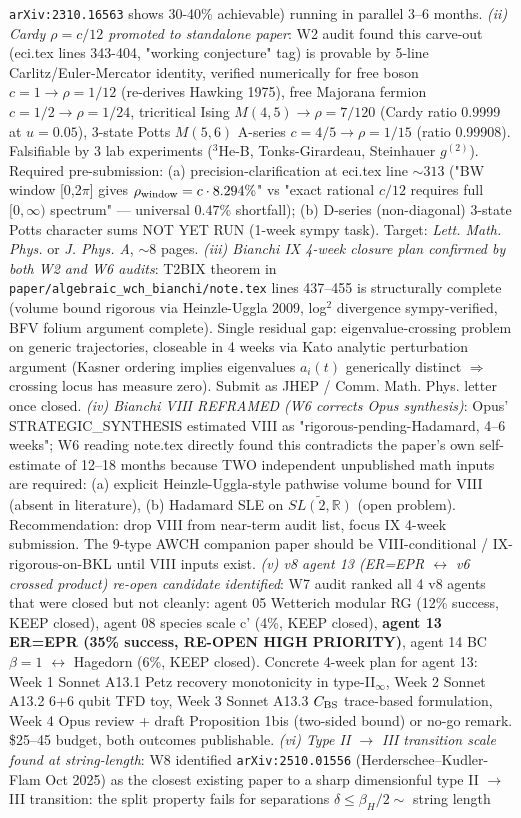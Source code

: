 \documentclass[reprint,amsmath,amssymb,aps,prd,superscriptaddress]{revtex4-2}
\providecommand{\1}{\mathbf{1}}
\begin{document}
\texttt{arXiv:2310.16563} shows 30-40\% achievable) running in parallel 3--6 months. \emph{(ii) Cardy $\rho = c/12$ promoted to standalone paper}: W2 audit found this carve-out (eci.tex lines 343-404, "working conjecture" tag) is provable by 5-line Carlitz/Euler-Mercator identity, verified numerically for free boson $c=1\to\rho=1/12$ (re-derives Hawking 1975), free Majorana fermion $c=1/2\to\rho=1/24$, tricritical Ising $M(4,5)\to\rho=7/120$ (Cardy ratio 0.9999 at $u=0.05$), 3-state Potts $M(5,6)$ A-series $c=4/5\to\rho=1/15$ (ratio 0.99908). Falsifiable by 3 lab experiments ($^3$He-B, Tonks-Girardeau, Steinhauer $g^{(2)}$). Required pre-submission: (a) precision-clarification at eci.tex line $\sim 313$ ("BW window [0,2$\pi$] gives $\rho_{\rm window} = c \cdot 8.294\%$" vs "exact rational $c/12$ requires full $[0,\infty)$ spectrum" — universal $0.47\%$ shortfall); (b) D-series (non-diagonal) 3-state Potts character sums NOT YET RUN (1-week sympy task). Target: \emph{Lett. Math. Phys.} or \emph{J. Phys. A}, $\sim 8$ pages. \emph{(iii) Bianchi IX 4-week closure plan confirmed by both W2 and W6 audits}: T2BIX theorem in \texttt{paper/algebraic\_wch\_bianchi/note.tex} lines 437--455 is structurally complete (volume bound rigorous via Heinzle-Uggla 2009, log$^2$ divergence sympy-verified, BFV folium argument complete). Single residual gap: eigenvalue-crossing problem on generic trajectories, closeable in 4 weeks via Kato analytic perturbation argument (Kasner ordering implies eigenvalues $a_i(t)$ generically distinct $\Rightarrow$ crossing locus has measure zero). Submit as JHEP / Comm. Math. Phys. letter once closed. \emph{(iv) Bianchi VIII REFRAMED (W6 corrects Opus synthesis)}: Opus' STRATEGIC\_SYNTHESIS estimated VIII as "rigorous-pending-Hadamard, 4--6 weeks"; W6 reading note.tex directly found this contradicts the paper's own self-estimate of 12--18 months because TWO independent unpublished math inputs are required: (a) explicit Heinzle-Uggla-style pathwise volume bound for VIII (absent in literature), (b) Hadamard SLE on $\widetilde{SL(2,\mathbb{R})}$ (open problem). Recommendation: drop VIII from near-term audit list, focus IX 4-week submission. The 9-type AWCH companion paper should be VIII-conditional / IX-rigorous-on-BKL until VIII inputs exist. \emph{(v) v8 agent 13 (ER=EPR $\leftrightarrow$ v6 crossed product) re-open candidate identified}: W7 audit ranked all 4 v8 agents that were closed but not cleanly: agent 05 Wetterich modular RG (12\% success, KEEP closed), agent 08 species scale c' (4\%, KEEP closed), \textbf{agent 13 ER=EPR (35\% success, RE-OPEN HIGH PRIORITY)}, agent 14 BC $\beta=1$ $\leftrightarrow$ Hagedorn (6\%, KEEP closed). Concrete 4-week plan for agent 13: Week 1 Sonnet A13.1 Petz recovery monotonicity in type-II$_\infty$, Week 2 Sonnet A13.2 6+6 qubit TFD toy, Week 3 Sonnet A13.3 $C_{\rm BS}$ trace-based formulation, Week 4 Opus review + draft Proposition 1bis (two-sided bound) or no-go remark. \$25--45 budget, both outcomes publishable. \emph{(vi) Type II $\to$ III transition scale found at string-length}: W8 identified \texttt{arXiv:2510.01556} (Herderschee--Kudler-Flam Oct 2025) as the closest existing paper to a sharp dimensionful type II $\to$ III transition: the split property fails for separations $\delta \le \beta_H/2 \sim$ string length 
\end{document}
